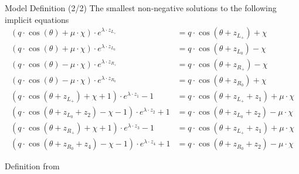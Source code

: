 \begin{frame}{Model Definition (2/2)}
	\vspace{-1em}
	The smallest non-negative solutions to the following implicit equations
	\begin{subequations}
		\begin{align*}
			(q \cdot \cos(\theta) + \mu \cdot \chi) \cdot e^{\lambda \cdot z_{L_+}}
			 & = q \cdot \cos(\theta + z_{L_+}) + \chi \label{equ:setup.og.def.impl.1.A}                  \\
			(q \cdot \cos(\theta) + \mu \cdot \chi) \cdot e^{\lambda \cdot z_{L_0}}
			 & = q \cdot \cos(\theta + z_{L_0}) - \chi                                                    \\
			(q \cdot \cos(\theta) - \mu \cdot \chi) \cdot e^{\lambda \cdot z_{R_+}}
			 & = q \cdot \cos(\theta + z_{R_+}) - \chi                                                    \\
			(q \cdot \cos(\theta) - \mu \cdot \chi) \cdot e^{\lambda \cdot z_{R_0}}
			 & = q \cdot \cos(\theta + z_{R_0}) + \chi \label{equ:setup.og.def.impl.1.D}
			\\
			(q \cdot \cos(\theta + z_{L_+}) + \chi + 1) \cdot e^{\lambda \cdot z_1} - 1
			 & = q \cdot  \cos(\theta + z_{L_+} + z_1) + \mu \cdot \chi \label{equ:setup.og.def.impl.2.A} \\
			(q \cdot \cos(\theta + z_{L_0} + z_2) - \chi - 1) \cdot e^{\lambda \cdot z_2} + 1
			 & = q \cdot  \cos(\theta + z_{L_0} + z_2) - \mu \cdot \chi                                   \\
			(q \cdot \cos(\theta + z_{R_+}) + \chi + 1) \cdot e^{\lambda \cdot z_3} - 1
			 & = q \cdot  \cos(\theta + z_{L_+} + z_1) + \mu \cdot \chi                                   \\
			(q \cdot \cos(\theta + z_{R_0} + z_4) - \chi - 1) \cdot e^{\lambda \cdot z_4} + 1
			 & = q \cdot  \cos(\theta + z_{R_0} + z_2) - \mu \cdot \chi \label{equ:setup.og.def.impl.2.D}
		\end{align*}
	\end{subequations}
	\begin{flushright}
		Definition from \cite{akyuz2022}
	\end{flushright}
\end{frame}

